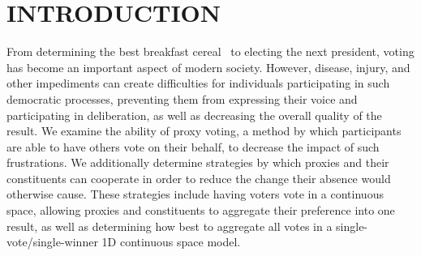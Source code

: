%
%

\chapter{INTRODUCTION}\label{ch:introduction}
\thispagestyle{empty}
From determining the best breakfast cereal~\cite{Curtis2021} to electing the next
president, voting has become an important aspect of modern society.
However, disease, injury, and other impediments can create difficulties for individuals
participating in such democratic processes, preventing them from expressing their
voice and participating in deliberation, as well as decreasing the overall quality of
the result.
We examine the ability of proxy voting, a method by which participants are able to
have others vote on their behalf, to decrease the impact of such frustrations.
We additionally determine strategies by which proxies and their constituents can
cooperate in order to reduce the change their absence would otherwise cause.
These strategies include having voters vote in a continuous space, allowing proxies
and constituents to aggregate their preference into one result, as well as
determining how best to aggregate all votes in a single-vote/single-winner 1D
continuous space model.

%









